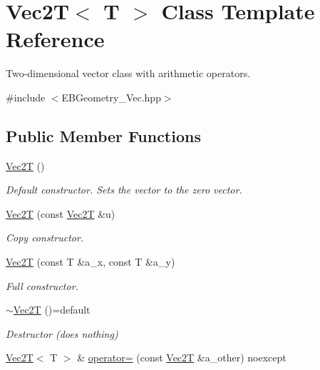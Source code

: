 \hypertarget{classVec2T}{}\section{Vec2T$<$ T $>$ Class Template Reference}
\label{classVec2T}


Two-\/dimensional vector class with arithmetic operators.  




{\ttfamily \#include $<$E\+B\+Geometry\+\_\+\+Vec.\+hpp$>$}

\subsection*{Public Member Functions}
\begin{DoxyCompactItemize}
\item 
\mbox{\label{classVec2T_a4aa6e0bd3922abd84449278429a03418}} 
\hyperlink{classVec2T_a4aa6e0bd3922abd84449278429a03418}{Vec2T} ()
\begin{DoxyCompactList}\small\item\em Default constructor. Sets the vector to the zero vector. \end{DoxyCompactList}\item 
\hyperlink{classVec2T_a15e8a7710ad0a1de03a34660ae54e96e}{Vec2T} (const \hyperlink{classVec2T}{Vec2T} \&u)
\begin{DoxyCompactList}\small\item\em Copy constructor. \end{DoxyCompactList}\item 
\hyperlink{classVec2T_a0721d6450bab8361f76ee63826f9e8f4}{Vec2T} (const T \&a\+\_\+x, const T \&a\+\_\+y)
\begin{DoxyCompactList}\small\item\em Full constructor. \end{DoxyCompactList}\item 
\mbox{\label{classVec2T_a15a9bac13b94b58f0907443bc551dbee}} 
\hyperlink{classVec2T_a15a9bac13b94b58f0907443bc551dbee}{$\sim$\+Vec2T} ()=default
\begin{DoxyCompactList}\small\item\em Destructor (does nothing) \end{DoxyCompactList}\item 
\hyperlink{classVec2T}{Vec2T}$<$ T $>$ \& \hyperlink{classVec2T_ab44f1c41a9a73757430403ea47e1ff33}{operator=} (const \hyperlink{classVec2T}{Vec2T} \&a\+\_\+other) noexcept

\end{DoxyCompactItemize}
